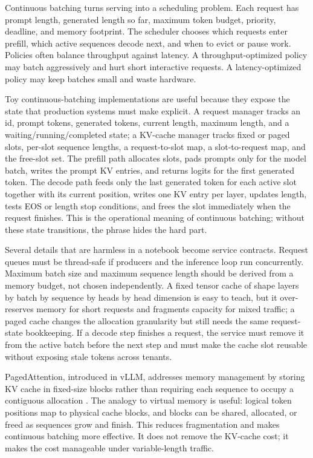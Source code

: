 Continuous batching turns serving into a scheduling problem. Each request has prompt length, generated length so far, maximum token budget, priority, deadline, and memory footprint. The scheduler chooses which requests enter prefill, which active sequences decode next, and when to evict or pause work. Policies often balance throughput against latency. A throughput-optimized policy may batch aggressively and hurt short interactive requests. A latency-optimized policy may keep batches small and waste hardware.

Toy continuous-batching implementations are useful because they expose the state that production systems must make explicit. A request manager tracks an id, prompt tokens, generated tokens, current length, maximum length, and a waiting/running/completed state; a KV-cache manager tracks fixed or paged slots, per-slot sequence lengths, a request-to-slot map, a slot-to-request map, and the free-slot set. The prefill path allocates slots, pads prompts only for the model batch, writes the prompt KV entries, and returns logits for the first generated token. The decode path feeds only the last generated token for each active slot together with its current position, writes one KV entry per layer, updates length, tests EOS or length stop conditions, and frees the slot immediately when the request finishes. This is the operational meaning of continuous batching; without these state transitions, the phrase hides the hard part.

Several details that are harmless in a notebook become service contracts. Request queues must be thread-safe if producers and the inference loop run concurrently. Maximum batch size and maximum sequence length should be derived from a memory budget, not chosen independently. A fixed tensor cache of shape layers by batch by sequence by heads by head dimension is easy to teach, but it over-reserves memory for short requests and fragments capacity for mixed traffic; a paged cache changes the allocation granularity but still needs the same request-state bookkeeping. If a decode step finishes a request, the service must remove it from the active batch before the next step and must make the cache slot reusable without exposing stale tokens across tenants.

PagedAttention, introduced in vLLM, addresses memory management by storing KV cache in fixed-size blocks rather than requiring each sequence to occupy a contiguous allocation \cite{kwon2023efficient}. The analogy to virtual memory is useful: logical token positions map to physical cache blocks, and blocks can be shared, allocated, or freed as sequences grow and finish. This reduces fragmentation and makes continuous batching more effective. It does not remove the KV-cache cost; it makes the cost manageable under variable-length traffic.

